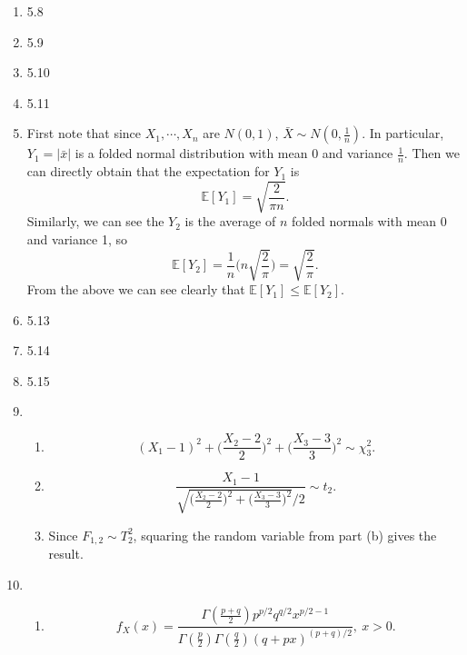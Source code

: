 \documentclass{article}
\begin{document}
\begin{enumerate}
    \item 5.8
    
    \item 5.9

    \item 5.10
    
    \item 5.11
    
    \item First note that since $X_1, \cdots, X_n$ are $N(0, 1)$, $\bar{X} \sim N(0, \frac{1}{n})$. In 
    particular, $Y_1 = |\bar{x}|$ is a folded normal distribution with mean 0 and variance $\frac{1}{n}$. 
    Then we can directly obtain that the expectation for $Y_1$ is 
    \[ \mathbb{E}[Y_1] = \sqrt{\frac{2}{\pi n}}. \]
    Similarly, we can see the $Y_2$ is the average of $n$ folded normals with mean 0 and variance 1, so 
    \[ \mathbb{E}[Y_2] = \frac{1}{n} \bigl( n\sqrt{\frac{2}{\pi}} \bigr) = \sqrt{\frac{2}{\pi}}. \]
    From the above we can see clearly that $\mathbb{E}[Y_1] \leq \mathbb{E}[Y_2]$.

    \item 5.13
    
    \item 5.14
    
    \item 5.15
    
    \item \begin{enumerate}
        \item \[ (X_1 - 1)^2 + \bigl( \frac{X_2 - 2}{2} \bigr)^2 + \bigl( \frac{X_3 - 3}{3} \bigr)^2 
        \sim \chi_3^2. \]

        \item \[ \frac{X_1 - 1}{\sqrt{\bigl( \frac{X_2 - 2}{2} \bigr)^2 + \bigl( \frac{X_3 - 3}{3} \bigr)^2}
        \big/ 2} \sim t_2. \]

        \item Since $F_{1, 2} \sim T_2^2$, squaring the random variable from part (b) gives the result.
    \end{enumerate}
    
    \item \begin{enumerate}
        \item \[ f_X(x) = \frac{\Gamma(\frac{p + q}{2}) p^{p / 2} q^{q / 2} x^{p / 2 - 1}}
        {\Gamma(\frac{p}{2}) \Gamma(\frac{q}{2}) (q + px)^{(p + q) / 2}}, \ x > 0. \]


\end{enumerate}
\end{enumerate}
\end{document}
